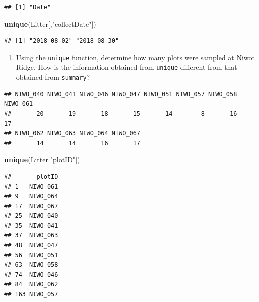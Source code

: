 \documentclass[]{article}
\newenvironment{Shaded}{\begin{snugshade}}{\end{snugshade}}
\newcommand{\KeywordTok}[1]{\textcolor[rgb]{0.13,0.29,0.53}{\textbf{#1}}}
\newcommand{\StringTok}[1]{\textcolor[rgb]{0.31,0.60,0.02}{#1}}
\newcommand{\OperatorTok}[1]{\textcolor[rgb]{0.81,0.36,0.00}{\textbf{#1}}}
\newcommand{\NormalTok}[1]{#1}
\providecommand{\tightlist}{%
  \setlength{\itemsep}{0pt}\setlength{\parskip}{0pt}}
\begin{document}
\begin{Shaded}
\end{Shaded}

\begin{verbatim}
## [1] "Date"
\end{verbatim}

\begin{Shaded}
\begin{Highlighting}[]
\KeywordTok{unique}\NormalTok{(Litter[,}\StringTok{"collectDate"}\NormalTok{])}
\end{Highlighting}
\end{Shaded}

\begin{verbatim}
## [1] "2018-08-02" "2018-08-30"
\end{verbatim}

\begin{enumerate}
\def\labelenumi{\arabic{enumi}.}
\setcounter{enumi}{12}
\tightlist
\item
  Using the \texttt{unique} function, determine how many plots were
  sampled at Niwot Ridge. How is the information obtained from
  \texttt{unique} different from that obtained from \texttt{summary}?
\end{enumerate}

\begin{Shaded}
\end{Shaded}

\begin{verbatim}
## NIWO_040 NIWO_041 NIWO_046 NIWO_047 NIWO_051 NIWO_057 NIWO_058 NIWO_061 
##       20       19       18       15       14        8       16       17 
## NIWO_062 NIWO_063 NIWO_064 NIWO_067 
##       14       14       16       17
\end{verbatim}

\begin{Shaded}
\begin{Highlighting}[]
\KeywordTok{unique}\NormalTok{(Litter[}\StringTok{"plotID"}\NormalTok{])}
\end{Highlighting}
\end{Shaded}

\begin{verbatim}
##       plotID
## 1   NIWO_061
## 9   NIWO_064
## 17  NIWO_067
## 25  NIWO_040
## 35  NIWO_041
## 37  NIWO_063
## 48  NIWO_047
## 56  NIWO_051
## 63  NIWO_058
## 74  NIWO_046
## 84  NIWO_062
## 163 NIWO_057
\end{verbatim}
\end{document}
